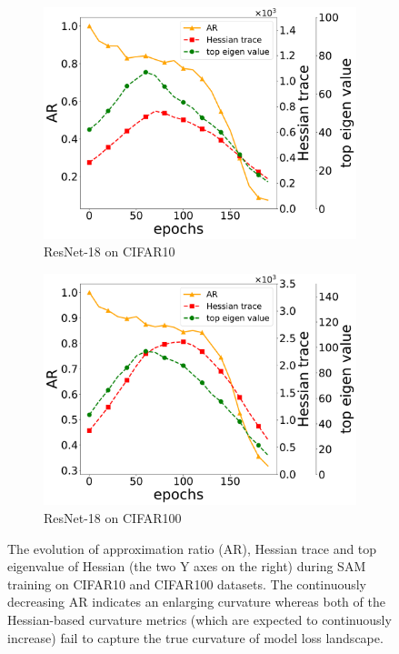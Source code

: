 \documentclass[letterpaper]{article} %
\theoremstyle{plain}
\theoremstyle{definition}
\begin{document}
\begin{figure}[t!]
   \centering
   \begin{subfigure}[b]{0.4\textwidth}
     \centering
     \includegraphics[width=\textwidth]{figs/cifar10_effectiveness.pdf}
     \caption{ResNet-18 on CIFAR10}
     \label{subfig:cifar10}
   \end{subfigure}
   \hspace{0.05\textwidth}
   \begin{subfigure}[b]{0.4\textwidth}
     \centering
     \includegraphics[width=\textwidth]{figs/cifar100_effectiveness.pdf}
     \caption{ResNet-18 on CIFAR100}
     \label{subfig:cifar100}
   \end{subfigure}
\caption{\footnotesize The evolution of approximation ratio (AR), Hessian trace and top eigenvalue of Hessian (the two Y axes on the right) during SAM training on CIFAR10 and CIFAR100 datasets. The continuously decreasing AR indicates an enlarging curvature whereas both of the Hessian-based curvature metrics (which are expected to continuously increase) fail to capture the true curvature of model loss landscape.}
\label{fig:AR}
\vspace{-0.5cm}
\end{figure}
\end{document}
